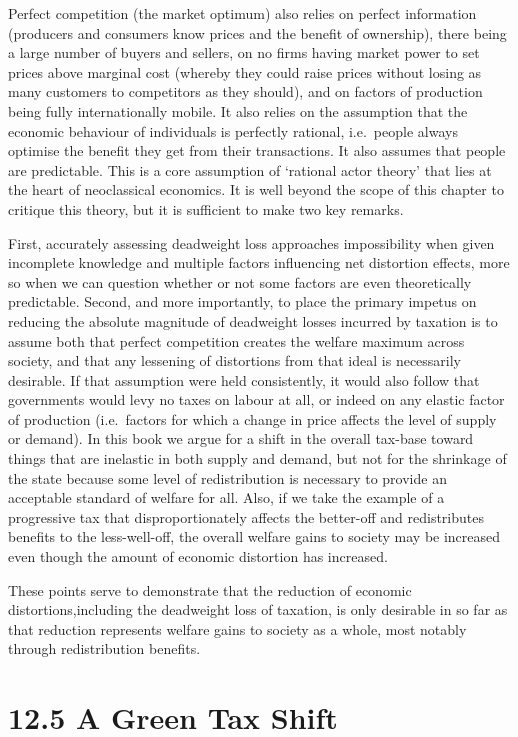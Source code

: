 \documentclass[]{tufte-handout}
\begin{document}
Perfect competition (the market optimum) also relies on perfect
information (producers and consumers know prices and the benefit of
ownership), there being a large number of buyers and sellers, on no
firms having market power to set prices above marginal cost (whereby
they could raise prices without losing as many customers to competitors
as they should), and on factors of production being fully
internationally mobile. It also relies on the assumption that the
economic behaviour of individuals is perfectly rational, i.e.~people
always optimise the benefit they get from their transactions. It also
assumes that people are predictable. This is a core assumption of
`rational actor theory' that lies at the heart of neoclassical
economics. It is well beyond the scope of this chapter to critique this
theory, but it is sufficient to make two key remarks.

First, accurately assessing deadweight loss approaches impossibility
when given incomplete knowledge and multiple factors influencing net
distortion effects, more so when we can question whether or not some
factors are even theoretically predictable. Second, and more
importantly, to place the primary impetus on reducing the absolute
magnitude of deadweight losses incurred by taxation is to assume both
that perfect competition creates the welfare maximum across society, and
that any lessening of distortions from that ideal is necessarily
desirable. If that assumption were held consistently, it would also
follow that governments would levy no taxes on labour at all, or indeed
on any elastic factor of production (i.e.~factors for which a change in
price affects the level of supply or demand). In this book we argue for
a shift in the overall tax-base toward things that are inelastic in both
supply and demand, but not for the shrinkage of the state because some
level of redistribution is necessary to provide an acceptable standard
of welfare for all. Also, if we take the example of a progressive tax
that disproportionately affects the better-off and redistributes
benefits to the less-well-off, the overall welfare gains to society may
be increased even though the amount of economic distortion has
increased.

These points serve to demonstrate that the reduction of economic
distortions,including the deadweight loss of taxation, is only desirable
in so far as that reduction represents welfare gains to society as a
whole, most notably through redistribution benefits.

\hypertarget{a-green-tax-shift}{%
\section{12.5 A Green Tax Shift}\label{a-green-tax-shift}}
\end{document}
